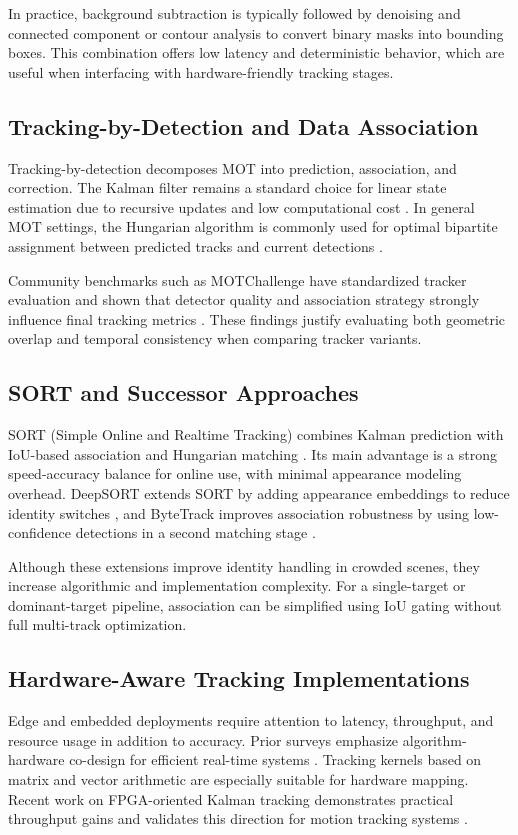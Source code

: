 In practice, background subtraction is typically followed by denoising and connected component 
or contour analysis to convert binary masks into bounding boxes. This combination offers low latency 
and deterministic behavior, which are useful when interfacing with hardware-friendly tracking stages.

\subsection{Tracking-by-Detection and Data Association}
Tracking-by-detection decomposes MOT into prediction, association, and correction. The Kalman 
filter remains a standard choice for linear state estimation due to recursive updates and low computational 
cost \cite{Kalman1960}. In general MOT settings, the Hungarian algorithm is commonly used for optimal 
bipartite assignment between predicted tracks and current detections \cite{Kuhn1955Hungarian}.

Community benchmarks such as MOTChallenge have standardized tracker evaluation and shown that detector 
quality and association strategy strongly influence final tracking metrics \cite{Milan2016MOT16}. These 
findings justify evaluating both geometric overlap and temporal consistency when comparing tracker variants.

\subsection{SORT and Successor Approaches}
SORT (Simple Online and Realtime Tracking) combines Kalman prediction with IoU-based association and 
Hungarian matching \cite{Bewley2016_sort}. Its main advantage is a strong speed-accuracy balance for 
online use, with minimal appearance modeling overhead. DeepSORT extends SORT by adding appearance embeddings 
to reduce identity switches \cite{Wojke2017DeepSORT}, and ByteTrack improves association robustness by using 
low-confidence detections in a second matching stage \cite{Zhang2022ByteTrack}.

Although these extensions improve identity handling in crowded scenes, they increase algorithmic and 
implementation complexity. For a single-target or dominant-target pipeline, association can be 
simplified using IoU gating without full multi-track optimization.

\subsection{Hardware-Aware Tracking Implementations}
Edge and embedded deployments require attention to latency, throughput, and resource usage in addition 
to accuracy. Prior surveys emphasize algorithm-hardware co-design for efficient real-time 
systems \cite{Sze2017EfficientDNN}. Tracking kernels based on matrix and vector arithmetic are 
especially suitable for hardware mapping. Recent work on FPGA-oriented Kalman tracking demonstrates 
practical throughput gains and validates this direction for motion tracking systems \cite{BABU2022101084}.

